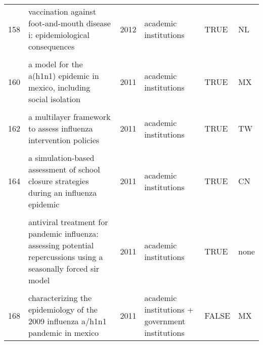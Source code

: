 \documentclass[
]{article}
\begin{document}
\begin{landscape}
\begin{longtable}{l>{\raggedright\arraybackslash}p{4cm}l>{\raggedright\arraybackslash}p{3.5cm}l>{\raggedright\arraybackslash}p{1.5cm}}
158 & vaccination against foot-and-mouth disease i: epidemiological consequences & 2012 & academic institutions & TRUE & NL\\
\cellcolor{gray!6}{159} & \cellcolor{gray!6}{a deterministic resource scheduling model in epidemic control: a case study} & \cellcolor{gray!6}{2011} & \cellcolor{gray!6}{academic institutions} & \cellcolor{gray!6}{TRUE} & \cellcolor{gray!6}{GR}\\
160 & a model for the a(h1n1) epidemic in mexico, including social isolation & 2011 & academic institutions & TRUE & MX\\
\addlinespace
\cellcolor{gray!6}{161} & \cellcolor{gray!6}{a model to evaluate mass vaccination against pneumococcus as a countermeasure against pandemic influenza} & \cellcolor{gray!6}{2011} & \cellcolor{gray!6}{academic institutions} & \cellcolor{gray!6}{TRUE} & \cellcolor{gray!6}{GB}\\
162 & a multilayer framework to assess influenza intervention policies & 2011 & academic institutions & TRUE & TW\\
\cellcolor{gray!6}{163} & \cellcolor{gray!6}{a note on the use of optimal control on a discrete time model of influenza dynamics} & \cellcolor{gray!6}{2011} & \cellcolor{gray!6}{academic institutions} & \cellcolor{gray!6}{TRUE} & \cellcolor{gray!6}{none}\\
164 & a simulation-based assessment of school closure strategies during an influenza epidemic & 2011 & academic institutions & TRUE & CN\\
\cellcolor{gray!6}{165} & \cellcolor{gray!6}{agent-based modeling of the spread of influenza-like illness in an emergency department: a simulation study} & \cellcolor{gray!6}{2011} & \cellcolor{gray!6}{academic institutions + government institutions} & \cellcolor{gray!6}{FALSE} & \cellcolor{gray!6}{CA}\\
\addlinespace
166 & antiviral treatment for pandemic influenza: assessing potential repercussions using a seasonally forced sir model & 2011 & academic institutions & TRUE & none\\
\cellcolor{gray!6}{167} & \cellcolor{gray!6}{can antiviral drugs contain pandemic influenza transmission?} & \cellcolor{gray!6}{2011} & \cellcolor{gray!6}{academic institutions} & \cellcolor{gray!6}{TRUE} & \cellcolor{gray!6}{none}\\
168 & characterizing the epidemiology of the 2009 influenza a/h1n1 pandemic in mexico & 2011 & academic institutions + government institutions & FALSE & MX\\

\end{longtable}
\end{landscape}
\end{document}
